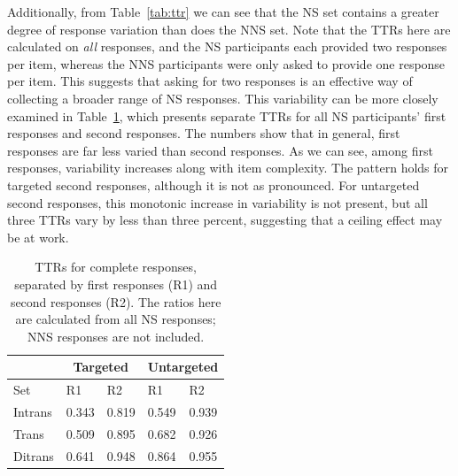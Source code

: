 Additionally, from Table~\ref{tab:ttr} we can see that the NS set contains a greater degree of response variation than does the NNS set. Note that the TTRs here are calculated on \textit{all} responses, and the NS participants each provided two responses per item, whereas the NNS participants were only asked to provide one response per item. This suggests that asking for two responses is an effective way of collecting a broader range of NS responses. This variability can be more closely examined in Table~\ref{tab:ttr1v2}, which presents separate TTRs for all NS participants' first responses and second responses. The numbers show that in general, first responses are far less varied than second responses. As we can see, among first responses, variability increases along with item complexity. The pattern holds for targeted second responses, although it is not as pronounced. For untargeted second responses, this monotonic increase in variability is not present, but all three TTRs vary by less than three percent, suggesting that a ceiling effect may be at work. 

\begin{table}[hb!]
\begin{center}
\begin{tabular}{|l||l|l||l|l|}
\hline
 & \multicolumn{2}{|c||}{Targeted} & \multicolumn{2}{|c|}{Untargeted} \\
\hline
 Set & R1 & R2 & R1 & R2 \\
\hline
\hline
Intrans & 0.343 & 0.819 & 0.549 & 0.939 \\
\hline
Trans & 0.509 & 0.895 & 0.682 & 0.926 \\ %
\hline
Ditrans & 0.641 & 0.948 & 0.864 & 0.955  \\ 
\hline
\end{tabular}
\caption{\label{tab:ttr1v2} TTRs for complete responses, separated by first responses (R1) and second responses (R2). The ratios here are calculated from all NS responses; NNS responses are not included.}
\end{center}
\end{table}

